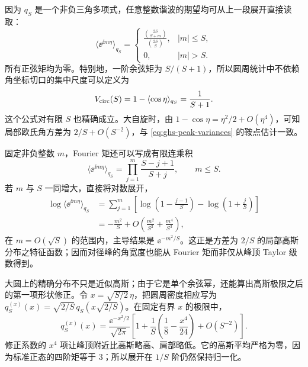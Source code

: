 \begin{proposition}
因为 $q_S$ 是一个非负三角多项式，任意整数谐波的期望均可从上一段展开直接读取：
\begin{equation}\label{eq:ghs-circle-fourier-moments}
 \langle\ee^{\ii m\eta}\rangle_{q_S}
 =\begin{cases}
 \displaystyle\frac{\binom{2S}{S+m}}{\binom{2S}{S}},& |m|\le S,\\[6pt]
 0,& |m|>S.
 \end{cases}
\end{equation}
所有正弦矩均为零。特别地，一阶余弦矩为 $S/(S+1)$，所以圆周统计中不依赖角坐标切口的集中尺度可以定义为
\begin{equation}\label{eq:ghs-circle-circular-variance}
 V_{\rm circ}(S)=1-\langle\cos\eta\rangle_{q_S}
 =\frac1{S+1}.
\end{equation}
这个公式对有限 $S$ 也精确成立。大自旋时，由 $1-\cos\eta=\eta^2/2+O(\eta^4)$，可知局部欧氏角方差为 $2/S+O(S^{-2})$，与 \cref{eq:ghs-peak-variances} 的鞍点估计一致。
\end{proposition}

固定非负整数 $m$，Fourier 矩还可以写成有限连乘积
\begin{equation}\label{eq:ghs-circle-moment-product}
 \langle\ee^{\ii m\eta}\rangle_{q_S}
 =\prod_{j=1}^{m}\frac{S-j+1}{S+j},\qquad m\le S.
\end{equation}
若 $m$ 与 $S$ 一同增大，直接将对数展开，
\begin{align*}
 \log\langle\ee^{\ii m\eta}\rangle_{q_S}
 &=\sum_{j=1}^m\left[\log\left(1-\frac{j-1}{S}\right)
 -\log\left(1+\frac{j}{S}\right)\right]\\
 &=-\frac{m^2}{S}+O\!\left(\frac{m^2}{S^2}+\frac{m^4}{S^3}\right),
\end{align*}
在 $m=O(\sqrt S)$ 的范围内，主导结果是 $\ee^{-m^2/S}$。这正是方差为 $2/S$ 的局部高斯分布之特征函数；因而对径峰的角宽度也能从 Fourier 矩而非仅从峰顶 Taylor 级数得到。


\begin{proposition}[圆周峰的第一项形状修正]
大圆上的精确分布不只是近似高斯；由于它是单个余弦幂，还能算出高斯极限之后的第一项形状修正。令 $x=\sqrt{S/2}\,\eta$，把圆周密度相应写为 $q_S^{(x)}(x)=\sqrt{2/S}\,q_S(x\sqrt{2/S})$。在固定有界 $x$ 的极限中，
\begin{equation}\label{eq:ghs-circle-edgeworth-correction}
 q_S^{(x)}(x)
 =\frac{\ee^{-x^2/2}}{\sqrt{2\pi}}
 \left[1+\frac1S\left(\frac18-\frac{x^4}{24}\right)
 +O(S^{-2})\right].
\end{equation}
修正系数的 $x^4$ 项让峰顶附近比高斯略高、肩部略低。它的高斯平均严格为零，因为标准正态的四阶矩等于 $3$；所以展开在 $1/S$ 阶仍然保持归一化。
\end{proposition}

